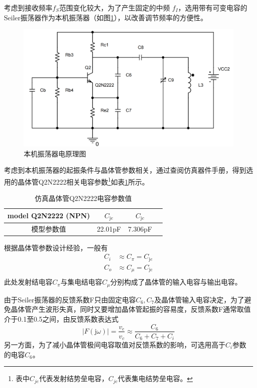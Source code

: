 \documentclass[a4paper,12pt,twoside]{article}
\begin{document}
考虑到接收频率$f_{S}$范围变化较大，为了产生固定的中频 $f_I$，选用带有可变电容的Seiler振荡器作为本机振荡器（如图\ref{本振sch}），以改善调节频率的方便性。
\begin{figure}[H]
    \centering
    \includegraphics[scale=0.125]{本振待调参原理图.png}
    \caption{本机振荡器电原理图}
    \label{本振sch}
\end{figure}
考虑到本机振荡器的起振条件与晶体管参数相关，通过查阅仿真器件手册\cite{2}，得到选用的晶体管Q2N2222相关电容参数\footnote{表中$C_{je}$代表发射结势垒电容，$C_{jc}$代表集电结势垒电容。}如表\ref{Q2N2222}所示。
\begin{table}[H]
    \centering
    \begin{tabular}{cccc}
    \toprule[2pt]
      model Q2N2222 (NPN)  &  $C_{\mathrm{j}e}$&$C_{\mathrm{j}c}$ \\
      \midrule[1pt]
        模型参数值  &22.01pF &7.306pF \\
        \bottomrule[2pt]
    \end{tabular}
    \caption{仿真晶体管Q2N2222电容参数值}
    \label{Q2N2222}
\end{table}

根据晶体管参数设计经验，一般有
\begin{equation}
    \begin{aligned}
    C_{i} &\approx C_{\pi}=C_{\mathrm{j}e} \\
    C_o &\approx C_{\mu} = C_{\mathrm{jc}}\\
    \end{aligned}
\end{equation}
此处发射结电容$C_{\pi}$与集电结电容$C_{\mu}$分别构成了晶体管的输入电容与输出电容。



由于Seiler振荡器的反馈系数F只由固定电容$C_6,C_7$及晶体管输入电容决定，为了避免晶体管产生波形失真，同时又要增加晶体管起振的容易度，反馈系数F通常取值介于0.1至0.5之间，由反馈系数表达式
\begin{equation}
    |F(\mathrm{j}\omega)|=\frac{v_e}{v_c}\approx \frac{C_6}{C_6+C_7+C_{i}}
\end{equation}
另一方面，为了减小晶体管极间电容取值对反馈系数的影响，可选用高于$C_i$参数的电容$C_6$。
\end{document}
